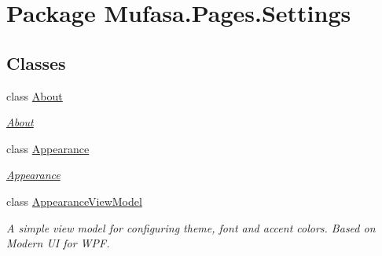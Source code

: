 \hypertarget{namespace_mufasa_1_1_pages_1_1_settings}{\section{Package Mufasa.\+Pages.\+Settings}
\label{namespace_mufasa_1_1_pages_1_1_settings}
}
\subsection*{Classes}
\begin{DoxyCompactItemize}
\item 
class \hyperlink{class_mufasa_1_1_pages_1_1_settings_1_1_about}{About}
\begin{DoxyCompactList}\small\item\em \hyperlink{class_mufasa_1_1_pages_1_1_settings_1_1_about}{About} \end{DoxyCompactList}\item 
class \hyperlink{class_mufasa_1_1_pages_1_1_settings_1_1_appearance}{Appearance}
\begin{DoxyCompactList}\small\item\em \hyperlink{class_mufasa_1_1_pages_1_1_settings_1_1_appearance}{Appearance} \end{DoxyCompactList}\item 
class \hyperlink{class_mufasa_1_1_pages_1_1_settings_1_1_appearance_view_model}{Appearance\+View\+Model}
\begin{DoxyCompactList}\small\item\em A simple view model for configuring theme, font and accent colors. Based on Modern U\+I for W\+P\+F. \end{DoxyCompactList}\end{DoxyCompactItemize}
